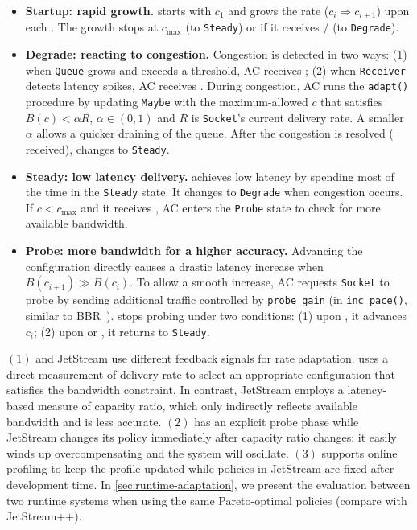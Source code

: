 \begin{itemize}[leftmargin=*, topsep=3pt, itemsep=0pt]

\item \textbf{Startup: rapid growth.} \sysname{} starts with $c_1$ and grows the
  rate ($c_i \Rightarrow c_{i+1}$) upon each \qe{}. The growth stops at
  $c_{\max}$ (to \texttt{Steady}) or if it receives \qc{}/\rc{} (to
  \texttt{Degrade}).

\item \textbf{Degrade: reacting to congestion.} Congestion is detected in two
  ways: (1) when \texttt{Queue} grows and exceeds a threshold, AC receives
  \qc{}; (2) when \texttt{Receiver} detects latency spikes, AC receives
  \rc{}. During congestion, AC runs the \texttt{adapt()} procedure by updating
  \texttt{Maybe} with the maximum-allowed $c$ that satisfies $B(c) < \alpha R$,
  $\alpha \in (0, 1)$ and $R$ is \texttt{Socket}'s current delivery rate. A
  smaller $\alpha$ allows a quicker draining of the queue. After the congestion
  is resolved (\qe{} received), \sysname{} changes to \texttt{Steady}.

\item \textbf{Steady: low latency delivery.} \sysname{} achieves low latency by
  spending most of the time in the \texttt{Steady} state. It changes to
  \texttt{Degrade} when congestion occurs. If $c < c_{\max}$ and it receives
  \qe{}, AC enters the \texttt{Probe} state to check for more available
  bandwidth.

\item \textbf{Probe: more bandwidth for a higher accuracy.} Advancing the
  configuration directly causes a drastic latency increase when
  $B(c_{i+1}) \gg B(c_i)$. To allow a smooth increase, AC requests
  \texttt{Socket} to probe by sending additional traffic controlled by
  \texttt{probe\_gain} (in \texttt{inc\_pace()}, similar to
  BBR~\cite{cardwell2017bbr}). \sysname{} stops probing under two conditions:
  (1) upon \spd{}, it advances $c_i$; (2) upon \qc{} or \rc{}, it returns to
  \texttt{Steady}.

\end{itemize}

 $(1)$ \sysname{} and JetStream
use different feedback signals for rate adaptation. \sysname{} uses a direct
measurement of delivery rate to select an appropriate configuration that
satisfies the bandwidth constraint. In contrast, JetStream employs a
latency-based measure of capacity ratio, which only indirectly reflects
available bandwidth and is less accurate. $(2)$ \sysname{} has an explicit probe
phase while JetStream changes its policy immediately after capacity ratio
changes: it easily winds up overcompensating and the system will
oscillate. $(3)$ \sysname{} supports online profiling to keep the profile
updated while policies in JetStream are fixed after development time. In
\autoref{sec:runtime-adaptation}, we present the evaluation between two runtime
systems when using the same Pareto-optimal policies (compare \sysname{} with
JetStream++).

